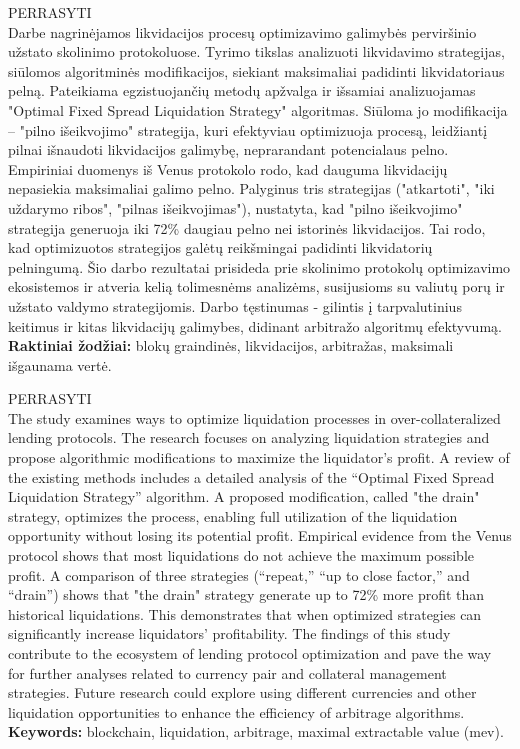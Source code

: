 \documentclass[]{VUMIFTemplateClass}
\begin{document}

\singlespacing


\tableofcontents

\onehalfspacing

PERRASYTI\\
Darbe nagrinėjamos likvidacijos procesų optimizavimo galimybės perviršinio užstato skolinimo protokoluose. Tyrimo tikslas analizuoti likvidavimo strategijas, siūlomos algoritminės modifikacijos, siekiant maksimaliai padidinti likvidatoriaus pelną. Pateikiama egzistuojančių metodų apžvalga ir išsamiai analizuojamas "Optimal Fixed Spread Liquidation Strategy" algoritmas. Siūloma jo modifikacija – "pilno išeikvojimo" strategija, kuri efektyviau optimizuoja procesą, leidžiantį pilnai išnaudoti likvidacijos galimybę, neprarandant potencialaus pelno. Empiriniai duomenys iš Venus protokolo rodo, kad dauguma likvidacijų nepasiekia maksimaliai galimo pelno. Palyginus tris strategijas ("atkartoti", "iki uždarymo ribos", "pilnas išeikvojimas"), nustatyta, kad "pilno išeikvojimo" strategija generuoja iki 72\% daugiau pelno nei istorinės likvidacijos. Tai rodo, kad optimizuotos strategijos galėtų reikšmingai padidinti likvidatorių pelningumą. Šio darbo rezultatai prisideda prie skolinimo protokolų optimizavimo ekosistemos ir atveria kelią tolimesnėms analizėms, susijusioms su valiutų porų ir užstato valdymo strategijomis. Darbo tęstinumas - gilintis į tarpvalutinius keitimus ir kitas likvidacijų galimybes, didinant arbitražo algoritmų efektyvumą.\\
\textbf{Raktiniai žodžiai:} blokų graindinės, likvidacijos, arbitražas, maksimali išgaunama vertė.

PERRASYTI\\
The study examines ways to optimize liquidation processes in over-collateralized lending protocols. The research focuses on analyzing liquidation strategies and propose algorithmic modifications to maximize the liquidator’s profit. A review of the existing methods includes a detailed analysis of the “Optimal Fixed Spread Liquidation Strategy” algorithm. A proposed modification, called "the drain" strategy, optimizes the process, enabling full utilization of the liquidation opportunity without losing its potential profit. Empirical evidence from the Venus protocol shows that most liquidations do not achieve the maximum possible profit. A comparison of three strategies (“repeat,” “up to close factor,” and “drain”) shows that "the drain" strategy generate up to 72\% more profit than historical liquidations. This demonstrates that when optimized strategies can significantly increase liquidators’ profitability. The findings of this study contribute to the ecosystem of lending protocol optimization and pave the way for further analyses related to currency pair and collateral management strategies. Future research could explore using different currencies and other liquidation opportunities to enhance the efficiency of arbitrage algorithms.\\
\textbf{Keywords:} blockchain, liquidation, arbitrage, maximal extractable value (mev).
\end{document}
